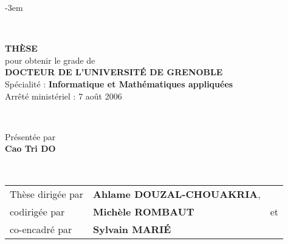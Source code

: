 \begingroup
\fontsize{13pt}{13pt}\selectfont

\AddToShipoutPicture*{\BackgroundPic}
\def\leftshift{0.82\textwidth}
\def\espvert{0.25cm}
\setlength{\parskip}{0pt}
\begin{titlepage}
\begin{adjustwidth}{}{-3em}
\begin{flushleft}

~~

\vfill

\begin{flushright}
\begin{minipage}{\leftshift}
\begin{flushleft}
\textsc{\Large \bf THÈSE}\\[\espvert]
{pour obtenir le grade de}\\[\espvert]
\textsc{\Large \bf DOCTEUR DE L'UNIVERSITÉ DE GRENOBLE}\\[\espvert]
{Spécialité : \textbf{Informatique et Mathématiques appliquées}}\\[\espvert]
{Arrêté ministériel : 7 août 2006}
\end{flushleft}
\end{minipage}
\end{flushright}~~\\[0.75cm]

\vfill

\begin{flushright}
\begin{minipage}{\leftshift}
\begin{flushleft}
{Présentée par}\\
{\Large \textbf{Cao Tri DO}}
\end{flushleft}
\end{minipage}
\end{flushright}~~\\[0.75cm]

\vfill

\begin{flushright}
\begin{minipage}{\leftshift}
\begin{flushleft}
{
\begin{tabular}{lll}
	Thèse dirigée par 	& \textbf{Ahlame DOUZAL-CHOUAKRIA},	& \\
	codirigée par 		& \textbf{Michèle ROMBAUT} 			& et \\
	co-encadré par 		& \textbf{Sylvain MARI\'{E}} 		&
\end{tabular}	
}
\end{flushleft}
\end{minipage}
\end{flushright}


\end{flushleft}
\end{adjustwidth}
\end{titlepage}
